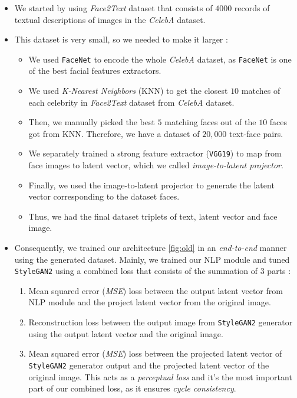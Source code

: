 \begin{itemize}
\item We started by using \emph{Face2Text} dataset that consists of $4000$ records of textual descriptions of images in the \emph{CelebA} dataset.
\item This dataset is very small, so we needed to make it larger :
\begin{itemize}
    \item We used \texttt{FaceNet} \cite{Schroff_2015} to encode the whole \emph{CelebA} dataset, as \texttt{FaceNet} is one of the best facial features extractors.
    \item We used \emph{K-Nearest Neighbors} (KNN) to get the closest $10$ matches of each celebrity in \emph{Face2Text} dataset from \emph{CelebA} dataset.
    \item Then, we manually picked the best $5$ matching faces out of the $10$ faces got from KNN. Therefore, we have a dataset of $20,000$ text-face pairs.
    \item We separately trained a strong feature extractor (\texttt{VGG19}) to map from face images to latent vector, which we called \emph{image-to-latent projector}.
    \item Finally, we used the image-to-latent projector to generate the latent vector corresponding to the dataset faces.
    \item Thus, we had the final dataset triplets of text, latent vector and face image.
\end{itemize}
\item Consequently, we trained our architecture \ref{fig:old} in an \emph{end-to-end} manner using the generated dataset. Mainly, we trained our NLP module and tuned \texttt{StyleGAN2} using a combined loss that consists of the summation of $3$ parts :
\begin{enumerate}
    \item Mean squared error (\emph{MSE}) loss between the output latent vector from NLP module and the project latent vector from the original image.
    \item Reconstruction loss between the output image from \texttt{StyleGAN2} generator using the output latent vector and the original image.
    \item Mean squared error (\emph{MSE}) loss between the projected latent vector of \texttt{StyleGAN2} generator output and the projected latent vector of the original image. This acts as a \emph{perceptual loss} and it's the most important part of our combined loss, as it ensures \emph{cycle consistency}.
\end{enumerate}
\end{itemize}

